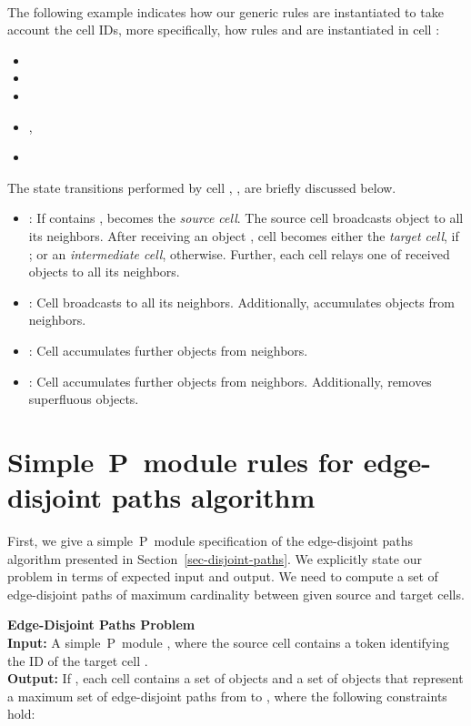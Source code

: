\documentclass[preliminary,copyright,creativecommons]{eptcs}
\theoremstyle{remark}
\begin{document}
~\

The following example indicates how our generic rules are instantiated to take account  the cell IDs, more specifically, how rules  and  are instantiated in cell :
\begin{itemize}
\item  
\item 
\item 
\item , 
\item 
\end{itemize}

The state transitions performed by cell , , 
are briefly discussed below.

\begin{itemize}
\item :
      If  contains ,  becomes the \emph{source cell}.
      The source cell broadcasts object  to all its neighbors.
      After receiving an object , 
      cell  becomes either the \emph{target cell}, if ;
      or an \emph{intermediate cell}, otherwise.
      Further, each cell relays one of received  objects to all its neighbors.

\item : 
      Cell  broadcasts  to all its neighbors.
      Additionally,  accumulates  objects from neighbors.

\item : 
      Cell  accumulates further  objects from neighbors.

\item : 
      Cell  accumulates further  objects from neighbors.
      Additionally,  removes superfluous  objects.
\end{itemize}


\section{Simple~P~module rules for edge-disjoint paths algorithm}
\label{sec-edge-disjoint-path-algorithm-rules}

First, we give a simple~P~module specification of the 
edge-disjoint paths algorithm presented in Section~\ref{sec-disjoint-paths}.  
We explicitly state our problem in terms of expected input and output.
We need to compute a set of edge-disjoint paths of maximum cardinality
between given source and target cells. 

\smallskip

\noindent \textbf{Edge-Disjoint Paths Problem}\\
\noindent \textbf{Input:} A simple~P~module , 
where the source cell  contains a token  identifying
the ID of the target cell .\\
\noindent \textbf{Output:}  If , each cell 
contains a set of objects  and  
a set of objects  that 
represent a maximum set of edge-disjoint paths from  to , 
where the following constraints hold:\\
\end{document}
